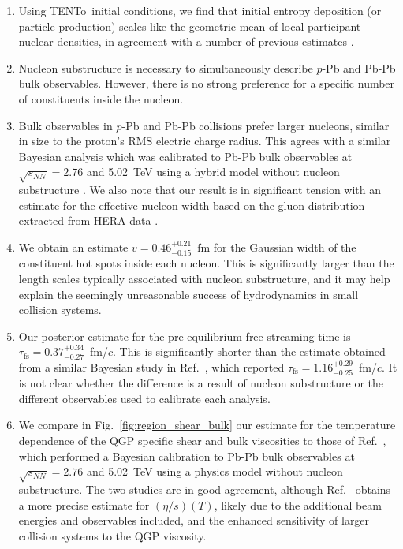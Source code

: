 \documentclass[aps,prc,reprint,amsmath,nofootinbib]{revtex4-1}
\newcommand{\trento}{T\raisebox{-0.5ex}{R}ENTo}
\newcommand{\sqrts}{\sqrt{s_{NN}}}
\newcommand{\taufs}{\tau_\text{fs}}
\begin{document}
\begin{enumerate}[itemsep=0pt, leftmargin=2\parindent]
  \item
    Using \trento\ initial conditions, we find that initial entropy deposition (or particle production) scales like the geometric mean of local participant nuclear densities, in agreement with a number of previous estimates \cite{Moreland:2014oya, Bernhard:2016tnd, Bernhard:2018hnz}.
  \item
    Nucleon substructure is necessary to simultaneously describe $p$-Pb and Pb-Pb bulk observables. However, there is no strong preference for a specific number of constituents inside the nucleon.
  \item
    Bulk observables in $p$-Pb and Pb-Pb collisions prefer larger nucleons, similar in size to the proton's RMS electric charge radius.
    This agrees with a similar Bayesian analysis which was calibrated to Pb-Pb bulk observables at $\sqrts=2.76$ and 5.02~TeV using a hybrid model without nucleon substructure \cite{Bernhard:2018hnz}.
    We also note that our result is in significant tension with an estimate for the effective nucleon width based on the gluon distribution extracted from HERA data \cite{Rezaeian:2012ji}.
  \item
    We obtain an estimate $v=0.46_{-0.15}^{+0.21}$~fm for the Gaussian width of the constituent hot spots inside each nucleon.
    This is significantly larger than the length scales typically associated with nucleon substructure, and it may help explain the seemingly unreasonable success of hydrodynamics in small collision systems.
  \item
    Our posterior estimate for the pre-equilibrium free-streaming time is $\taufs=0.37_{-0.27}^{+0.34}$~fm/$c$.
    This is significantly shorter than the estimate obtained from a similar Bayesian study in Ref.~\cite{Bernhard:2018hnz}, which reported $\taufs=1.16_{-0.25}^{+0.29}$~fm/$c$.
    It is not clear whether the difference is a result of nucleon substructure or the different observables used to calibrate each analysis.
  \item
    We compare in Fig.~\ref{fig:region_shear_bulk} our estimate for the temperature dependence of the QGP specific shear and bulk viscosities to those of Ref.~\cite{Bernhard:2018hnz}, which performed a Bayesian calibration to Pb-Pb bulk observables at $\sqrts=2.76$ and 5.02~TeV using a physics model without nucleon substructure.
    The two studies are in good agreement, although Ref.~\cite{Bernhard:2018hnz} obtains a more precise estimate for $(\eta/s)(T)$, likely due to the additional beam energies and observables included, and the enhanced sensitivity of larger collision systems to the QGP viscosity.

\end{enumerate}
\end{document}
